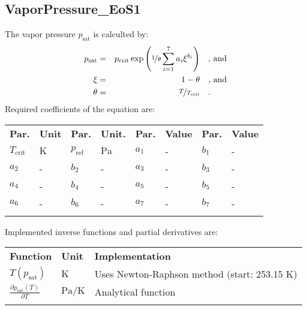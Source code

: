 \subsection{VaporPressure\_EoS1}
\label{cha:approaches:refp:eos1}
%
The vapor pressure $p_\mathrm{sat}$ is calculted by:
%
\begin{equation*}
	\begin{split}
		p_\mathrm{sat} &=& p_\mathrm{crit} \exp \left( \nicefrac{1}{\theta} \sum_{i=1}^{7} a_i \xi^{b_i} \right) & \quad\text{, and} \\
		\xi &=& 1 - \theta & \quad\text{, and} \\
		\theta &=& \nicefrac{T}{T_\mathrm{crit}} & \quad\text{.}
	\end{split}
\end{equation*}
%
Required coefficients of the equation are:
%
\begin{longtable}[l]{ll|ll|ll|ll}
	\toprule
	\addlinespace
	\textbf{Par.} & \textbf{Unit} & \textbf{Par.} &	\textbf{Unit.} & \textbf{Par.} & \textbf{Value} & \textbf{Par.} & \textbf{Value} \\
	\addlinespace
	\midrule
	\endhead
	
	\bottomrule
	\endfoot
	\bottomrule
	\endlastfoot
	\addlinespace
	
	$T_\mathrm{crit}$ & $\si{\kelvin}$ & $p_\mathrm{ref}$ & $\si{\pascal}$ &$a_1$ & - & $b_1$ & - \\	
	$a_2$ & - &	$b_2$ & - &	$a_3$ & - &	$b_3$ & - \\	
	$a_4$ & - &	$b_4$ & - &	$a_5$ & - &	$b_5$ & - \\	
	$a_6$ & - &	$b_6$ & - &	$a_7$ & - & $b_7$ & - \\
	
	
	\addlinespace
\end{longtable}
%
Implemented inverse functions and partial derivatives are:
%
\begin{longtable}[l]{l|l|l}
	\toprule
	\addlinespace
	\textbf{Function} & \textbf{Unit} &	\textbf{Implementation} \\
	\addlinespace
	\midrule
	\endhead
	
	\bottomrule
	\endfoot
	\bottomrule
	\endlastfoot
	\addlinespace
		
	$T(p_\mathrm{sat})$	& $\si{\kelvin}$ & Uses Newton-Raphson method (start: 253.15 K) \\
	$\frac{\partial p_\mathrm{sat}(T)}{\partial T}$	& $\si{\pascal\per\kelvin}$ & Analytical function\\
	
	\addlinespace
\end{longtable}
%
